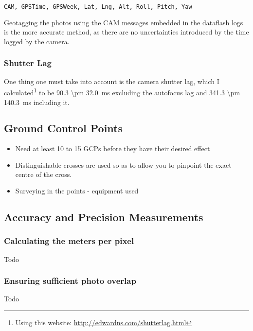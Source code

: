 \begin{verbatim}
CAM, GPSTime, GPSWeek, Lat, Lng, Alt, Roll, Pitch, Yaw
\end{verbatim}

Geotagging the photos using the CAM messages embedded in the dataflash logs is
the more accurate method, as there are no uncertainties introduced by the time
logged by the camera. 

\subsubsection{Shutter Lag}

One thing one must take into account is the camera shutter lag, which I
calculated\footnote{Using this website:
\url{http://edwardns.com/shutterlag.html}} to be \SI{90.3 \pm
32.0}{ms} excluding the autofocus lag and \SI{341.3 \pm
140.3}{ms} including it.

\subsection{Ground Control Points}

\begin{itemize}

\item Need at least 10 to 15 GCPs before they have their desired effect

\item Distinguishable crosses are used so as to allow you to pinpoint the exact
centre of the cross.

\item Surveying in the points - equipment used

\end{itemize}

\subsection{Accuracy and Precision Measurements}

\subsubsection{Calculating the meters per pixel}

Todo

\subsubsection{Ensuring sufficient photo overlap}

Todo

